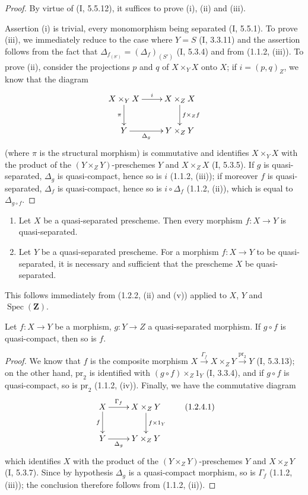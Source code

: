 \begin{proof}
By virtue of (I, 5.5.12), it suffices to prove (i), (ii) and (iii).

Assertion (i) is trivial, every monomorphism being separated (I, 5.5.1).
To prove (iii), we immediately reduce to the case where $Y=S$ (I, 3.3.11) and
the assertion follows from the fact that
$\Delta_{f_{(S')}}=(\Delta_f)_{(S')}$ (I, 5.3.4) and from (1.1.2, (iii)). To
prove (ii), consider the projections $p$ and $q$ of $X\times_Y X$ onto
$X$; if $i=(p,q)_Z$, we know that the diagram
\[
\xymatrix{
  X\times_Y X \ar[r]^-{i} \ar[d]_-{\pi} & X\times_Z X
    \ar[d]^-{f\times_Z f} \\
  Y \ar[r]_-{\Delta_g} & Y\times_Z Y
}
\]
(where $\pi$ is the structural morphism) is commutative and identifies
$X\times_Y X$ with the product of the $(Y\times_Z Y)$-preschemes $Y$ and
$X\times_Z X$ (I, 5.3.5). If $g$ is quasi-separated, $\Delta_g$ is
quasi-compact, hence so is $i$ (1.1.2, (iii)); if moreover $f$
is quasi-separated, $\Delta_f$ is quasi-compact, hence so is
$i\circ\Delta_f$ (1.1.2, (ii)), which is equal to $\Delta_{g\circ f}$.
\end{proof}

\begin{corollary}[1.2.3]
\label{IV.1.2.3}
\begin{enumerate}
  \item[(i)] Let $X$ be a quasi-separated prescheme. Then every morphism
  $f:X\to Y$ is quasi-separated.
  \item[(ii)] Let $Y$ be a quasi-separated prescheme. For a morphism
  $f:X\to Y$ to be quasi-separated, it is necessary and sufficient that the
  prescheme $X$ be quasi-separated.
\end{enumerate}
\end{corollary}

This follows immediately from (1.2.2, (ii) and (v)) applied to $X$, $Y$ and
$\operatorname{Spec}(\mathbf Z)$.

\begin{proposition}[1.2.4]
\label{IV.1.2.4}
Let $f:X\to Y$ be a morphism, $g:Y\to Z$ a quasi-separated morphism. If
$g\circ f$ is quasi-compact, then so is $f$.
\end{proposition}

\begin{proof}
We know that $f$ is the composite morphism
$X\xrightarrow{\Gamma_f}X\times_ZY\xrightarrow{\mathrm{pr}_2}Y$
(I, 5.3.13); on the other hand, $\mathrm{pr}_2$ is identified with
$(g\circ f)\times_Z1_Y$ (I, 3.3.4), and if $g\circ f$ is quasi-compact, so
is $\mathrm{pr}_2$ (1.1.2, (iv)). Finally, we have the commutative
diagram
\[
\xymatrix{
  X \ar[r]^-{\Gamma_f} \ar[d]_-{f} & X\times_ZY
    \ar[d]^-{f\times 1_Y} \\
  Y \ar[r]_-{\Delta_g} & Y\times_ZY
}
\tag{1.2.4.1}
\label{IV.1.2.4.1}
\]
which identifies $X$ with the product of the $(Y\times_ZY)$-preschemes $Y$ and
$X\times_ZY$ (I, 5.3.7). Since by hypothesis $\Delta_g$ is a quasi-compact
morphism, so is $\Gamma_f$ (1.1.2, (iii)); the conclusion
therefore follows from (1.1.2, (ii)).
\end{proof}

